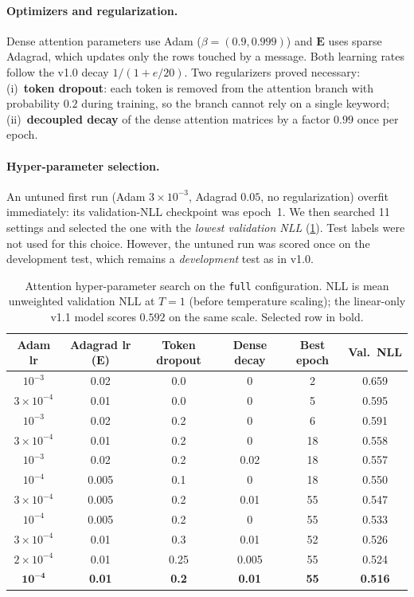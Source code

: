 \documentclass[11pt,a4paper]{article}
\theoremstyle{remark}
\newcommand{\lbl}[1]{\texttt{#1}}                      %
\begin{document}
\paragraph{Optimizers and regularization.} Dense attention parameters use Adam
($\beta=(0.9,0.999)$) and $\bm E$ uses sparse Adagrad, which updates only the
rows touched by a message. Both learning rates follow the v1.0 decay
$1/(1+e/20)$. Two regularizers proved necessary:
(i)~\textbf{token dropout}: each token is removed from the attention branch with
probability $0.2$ during training, so the branch cannot rely on a single
keyword; (ii)~\textbf{decoupled decay} of the dense attention matrices by
a factor $0.99$ once per epoch.

\paragraph{Hyper-parameter selection.} An untuned first run (Adam $3\!\times\!10^{-3}$,
Adagrad $0.05$, no regularization) overfit immediately: its validation-NLL
checkpoint was epoch~1. We then searched 11 settings and selected the one with
the \emph{lowest validation NLL} (\cref{tab:v11grid}). Test labels were not
used for this choice. However, the untuned run was scored once on the
development test, which remains a \emph{development} test as in v1.0.

\begin{table}[h]
\centering\small
\caption{Attention hyper-parameter search on the \lbl{full} configuration. NLL
is mean unweighted validation NLL at $T{=}1$ (before temperature scaling); the
linear-only v1.1 model scores $0.592$ on the same scale. Selected row in bold.}
\label{tab:v11grid}
\begin{tabular}{@{}cccc cc@{}}
\toprule
Adam lr & Adagrad lr ($\bm E$) & Token dropout & Dense decay & Best epoch & Val.\ NLL \\
\midrule
$10^{-3}$           & 0.02  & 0.0  & 0     &  2 & 0.659 \\
$3\times10^{-4}$    & 0.01  & 0.0  & 0     &  5 & 0.595 \\
$10^{-3}$           & 0.02  & 0.2  & 0     &  6 & 0.591 \\
$3\times10^{-4}$    & 0.01  & 0.2  & 0     & 18 & 0.558 \\
$10^{-3}$           & 0.02  & 0.2  & 0.02  & 18 & 0.557 \\
$10^{-4}$           & 0.005 & 0.1  & 0     & 18 & 0.550 \\
$3\times10^{-4}$    & 0.005 & 0.2  & 0.01  & 55 & 0.547 \\
$10^{-4}$           & 0.005 & 0.2  & 0     & 55 & 0.533 \\
$3\times10^{-4}$    & 0.01  & 0.3  & 0.01  & 52 & 0.526 \\
$2\times10^{-4}$    & 0.01  & 0.25 & 0.005 & 55 & 0.524 \\
$\mathbf{10^{-4}}$  & \textbf{0.01} & \textbf{0.2} & \textbf{0.01} & \textbf{55} & \textbf{0.516} \\
\bottomrule
\end{tabular}
\end{table}
\end{document}
